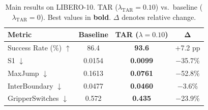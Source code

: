 \begin{table}[t]
\centering
\caption{Main results on LIBERO-10. TAR ($\lambda_{\text{TAR}}=0.10$) vs.\ baseline ($\lambda_{\text{TAR}}=0$). Best values in \textbf{bold}. $\Delta$ denotes relative change.}
\label{tab:main_results}
\begin{tabular}{lccc}
\toprule
\textbf{Metric} & \textbf{Baseline} & \textbf{TAR ($\lambda{=}0.10$)} & $\boldsymbol{\Delta}$ \\
\midrule
Success Rate (\%) $\uparrow$ & 86.4 & \textbf{93.6} & +7.2 pp \\
S1 $\downarrow$ & 0.0154 & \textbf{0.0099} & $-$35.7\% \\
MaxJump $\downarrow$ & 0.1613 & \textbf{0.0761} & $-$52.8\% \\
InterBoundary $\downarrow$ & 0.0477 & \textbf{0.0460} & $-$3.6\% \\
GripperSwitches $\downarrow$ & 0.572 & \textbf{0.435} & $-$23.9\% \\
\bottomrule
\end{tabular}
\end{table}

